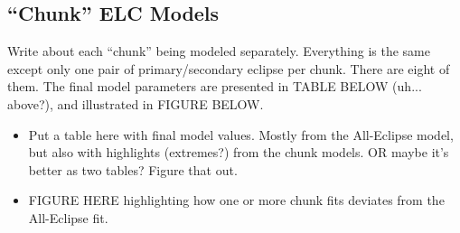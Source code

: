 \subsection{``Chunk'' ELC Models}
Write about each ``chunk'' being modeled separately. Everything is the same except only one pair of primary/secondary eclipse per chunk. There are eight of them. The final model parameters are presented in TABLE BELOW (uh... above?), and illustrated in FIGURE BELOW.

\begin{itemize}
\item Put a table here with final model values. Mostly from the All-Eclipse model, but also with highlights (extremes?) from the chunk models. OR maybe it's better as two tables? Figure that out.
\item FIGURE HERE highlighting how one or more chunk fits deviates from the All-Eclipse fit.
\end{itemize}